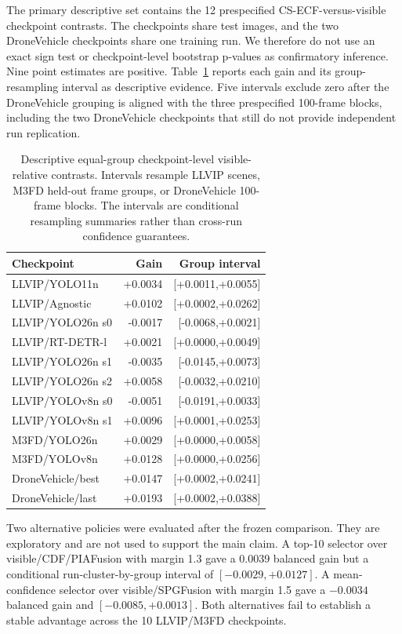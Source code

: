 \documentclass[11pt]{article}
\begin{document}
The primary descriptive set contains the 12 prespecified
CS-ECF-versus-visible checkpoint contrasts. The checkpoints share test images,
and the two DroneVehicle checkpoints share one training run. We therefore do
not use an exact sign test or checkpoint-level bootstrap p-values as
confirmatory inference. Nine point estimates are positive.
Table~\ref{tab:checkpoint-intervals} reports each gain and its
group-resampling interval as descriptive evidence.
Five intervals exclude zero after the DroneVehicle grouping is aligned with
the three prespecified 100-frame blocks, including the two DroneVehicle
checkpoints that still do not provide independent run replication.

\begin{table}[ht]
\centering
\scriptsize
\setlength{\tabcolsep}{3pt}
\caption{Descriptive equal-group checkpoint-level visible-relative contrasts.
Intervals resample LLVIP scenes, M3FD held-out frame groups, or DroneVehicle
100-frame blocks. The intervals are conditional resampling summaries rather
than cross-run confidence guarantees.}
\label{tab:checkpoint-intervals}
\begin{tabular}{@{}lrr@{}}
\toprule
Checkpoint & Gain & Group interval \\
\midrule
LLVIP/YOLO11n & +0.0034 & [+0.0011,+0.0055] \\
LLVIP/Agnostic & +0.0102 & [+0.0002,+0.0262] \\
LLVIP/YOLO26n s0 & -0.0017 & [-0.0068,+0.0021] \\
LLVIP/RT-DETR-l & +0.0021 & [+0.0000,+0.0049] \\
LLVIP/YOLO26n s1 & -0.0035 & [-0.0145,+0.0073] \\
LLVIP/YOLO26n s2 & +0.0058 & [-0.0032,+0.0210] \\
LLVIP/YOLOv8n s0 & -0.0051 & [-0.0191,+0.0033] \\
LLVIP/YOLOv8n s1 & +0.0096 & [+0.0001,+0.0253] \\
M3FD/YOLO26n & +0.0029 & [+0.0000,+0.0058] \\
M3FD/YOLOv8n & +0.0128 & [+0.0000,+0.0256] \\
DroneVehicle/best & +0.0147 & [+0.0002,+0.0241] \\
DroneVehicle/last & +0.0193 & [+0.0002,+0.0388] \\
\bottomrule
\end{tabular}
\end{table}

Two alternative policies were evaluated after the frozen comparison. They are
exploratory and are not used to support the main claim. A top-10 selector over
visible/CDF/PIAFusion with margin 1.3 gave a 0.0039 balanced gain but a
conditional run-cluster-by-group interval of \([-0.0029,+0.0127]\). A
mean-confidence selector over
visible/SPGFusion with margin 1.5 gave a \(-0.0034\) balanced gain and
\([-0.0085,+0.0013]\). Both alternatives fail to establish a stable advantage
across the 10 LLVIP/M3FD checkpoints.
\end{document}
